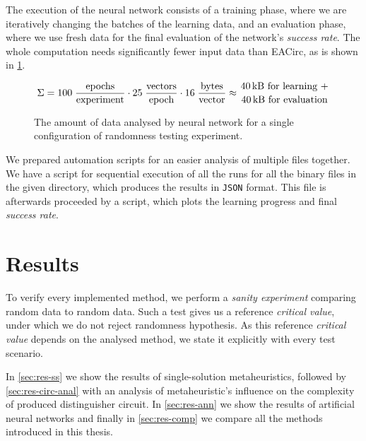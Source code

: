 \documentclass[
    digital,    %
    oneside,    %
    color,
    11pt,
    nocover,
    notable,
    nolof,
    nolot,
]{fithesis3}
\begin{document}
The execution of the neural network consists of a training phase, where we are iteratively changing the batches of the learning data, and an evaluation phase, where we use fresh data for the final evaluation of the network's \textit{success rate}. The whole computation needs significantly fewer input data than EACirc, as is shown in \cref{fig:ann-dataUsage}.

\begin{figure}[t]
    \begin{equation*}
        \begin{aligned}
    \Sigma = 
             100 \;
             \frac{\textnormal{epochs}}
                  {\textnormal{experiment}}
             \cdot
             25 \;
             \frac{\textnormal{vectors}}
                  {\textnormal{epoch}}
             \cdot
             16 \;
             \frac{\textnormal{bytes}}
                  {\textnormal{vector}}
             \approx {40 \textnormal{\,kB for learning +} \atop {40 \textnormal{\,kB for evaluation}}}
        \end{aligned}
    \end{equation*}
    \caption{The amount of data analysed by neural network for a single configuration of randomness testing experiment.}
    \label{fig:ann-dataUsage}
\end{figure}

We prepared automation scripts for an easier analysis of multiple files together. We have a script for sequential execution of all the runs for all the binary files in the given directory, which produces the results in \texttt{JSON} format. This file is afterwards proceeded by a script, which plots the learning progress and final \textit{success rate}.


\chapter{Results}
\label{chap:res}

To verify every implemented method, we perform a \textit{sanity experiment} comparing random data to random data. Such a test gives us a reference \textit{critical value}, under which we do not reject randomness hypothesis. As this reference \textit{critical value} depends on the analysed method, we state it explicitly with every test scenario.

In \cref{sec:res-ss} we show the results of single-solution metaheuristics, followed by \cref{sec:res-circ-anal} with an analysis of metaheuristic's influence on the complexity of produced distinguisher circuit. In \cref{sec:res-ann} we show the results of artificial neural networks and finally in \cref{sec:res-comp} we compare all the methods introduced in this thesis.
\end{document}
